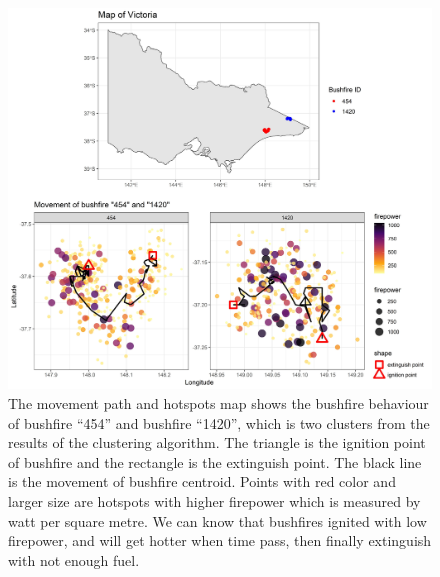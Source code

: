 \documentclass[11pt,a4paper,]{article}
\begin{document}
\begin{figure}
\centering
\includegraphics[width=5.20833in,height=\textheight]{figures/fire_mov.jpg}
\caption{The movement path and hotspots map shows the bushfire behaviour of bushfire ``454'' and bushfire ``1420'', which is two clusters from the results of the clustering algorithm. The triangle is the ignition point of bushfire and the rectangle is the extinguish point. The black line is the movement of bushfire centroid. Points with red color and larger size are hotspots with higher firepower which is measured by watt per square metre. We can know that bushfires ignited with low firepower, and will get hotter when time pass, then finally extinguish with not enough fuel. \label{fig:mov}}
\end{figure}
\end{document}
